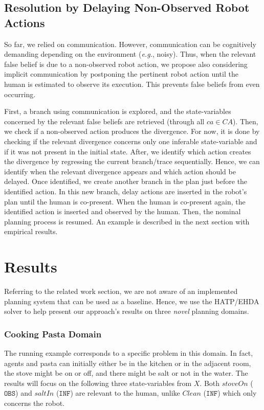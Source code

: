     \subsection{Resolution by Delaying Non-Observed Robot Actions}

So far, we relied on communication. However, communication can be cognitively demanding depending on the environment (\textit{e.g.}, noisy). 
Thus, when the relevant false belief is due to a non-observed robot action, we propose also considering implicit communication by postponing the pertinent robot action until the human is estimated to observe its execution. 
This prevents false beliefs from even occurring.

First, a branch using communication is explored, and the state-variables concerned by the relevant false beliefs are retrieved (through all $ca \in CA$).
Then, we check if a non-observed action produces the divergence. For now, it is done by checking if the relevant divergence concerns only one inferable state-variable and if it was not present in the initial state.   
After, we identify which action creates the divergence by regressing the current branch/trace sequentially. Hence, we can identify when the relevant divergence appears and which action should be delayed.
Once identified, we create another branch in the plan just before the identified action. In this new branch, {\sc delay} actions are inserted in the robot's plan until the human is co-present. When the human is co-present again, the identified action is inserted and observed by the human. Then, the nominal planning process is resumed. An example is described in the next section with empirical results.

\section{Results}

Referring to the related work section, we are not aware of an implemented planning system that can be used as a baseline. Hence, we use the HATP/EHDA solver to help present our approach's results on three \textit{novel} planning domains.

\subsubsection{Cooking Pasta Domain}
The running example corresponds to a specific problem in this domain. In fact, agents and pasta can initially either be in the kitchen or in the adjacent room, the stove might be on or off, and there might be salt or not in the water.  
The results will focus on the following three state-variables from $X$. Both $stoveOn$ ($\texttt{OBS}$) and $saltIn$ ($\texttt{INF}$) are relevant to the human, unlike $Clean$ ($\texttt{INF}$) which only concerns the robot. 

